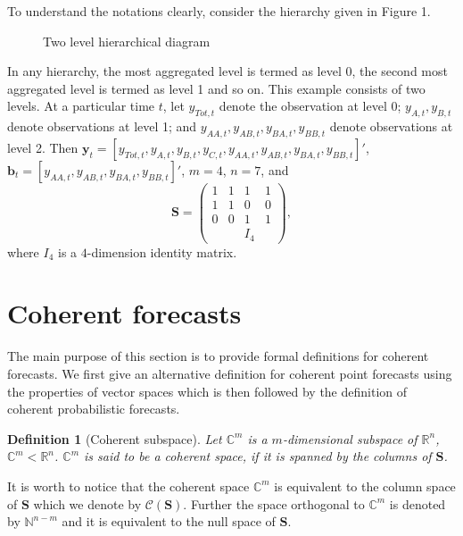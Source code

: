 \documentclass[a4paper, 11pt]{article}
\newtheorem{definition}{Definition}[section]
\begin{document}
\noindent 
To understand the notations clearly, consider the hierarchy given in Figure 1.
\begin{figure}[H]
	\begin{center}
		  
		 
		\qobitree
	\end{center}
	\caption{Two level hierarchical diagram}
\end{figure}
\noindent
In any hierarchy, the most aggregated level is termed as level 0, the second most aggregated level is termed as level 1 and so on. This example consists of two levels. At a particular time $t$, let $y_{Tot,t}$ denote the observation at level 0; $y_{A,t}, y_{B,t} $ denote observations at level 1; and $y_{AA,t}, y_{AB,t}, y_{BA,t}, y_{BB,t}$ denote observations at level 2. Then $\bm{y}_t = [y_{Tot,t},y_{A,t}, y_{B,t},y_{C,t},y_{AA,t}, y_{AB,t}, y_{BA,t}, y_{BB,t}]'$, \\$\bm{b}_t = [y_{AA,t}, y_{AB,t}, y_{BA,t}, y_{BB,t}]'$, $m=4$, $n=7$, and $$ \bm{S} = \begin{pmatrix} 1& 1 &1 &1  \\ 1 &1 & 0 &0 \\   0&0  & 1 & 1 \\ & & I_4 &   \end{pmatrix}, $$ where $I_4$ is a $4$-dimension identity matrix.  

\section{Coherent forecasts}\label{sec:definitions}

The main purpose of this section is to provide formal definitions for coherent forecasts. We first give an alternative definition for coherent point forecasts using the properties of vector spaces which is then followed by the definition of coherent probabilistic forecasts. 

\begin{definition}[Coherent subspace]
	Let $\bm{\mathbb{C}}^m$ is a $m$-dimensional subspace of $\bm{\mathbb{R}}^n$, $\bm{\mathbb{C}}^m < \bm{\mathbb{R}}^n$. $\bm{\mathbb{C}}^m$ is said to be a coherent space, if it is spanned by the columns of $\bm{S}$. 
\end{definition}

It is worth to notice that the coherent space $\bm{\mathbb{C}}^m$ is equivalent to the column space of $\bm{S}$ which we denote by $\mathscr{C}(\bm{S})$. Further the space orthogonal to $\bm{\mathbb{C}}^m$ is denoted by $\bm{\mathbb{N}}^{n-m}$ and it is equivalent to the null space of $\bm{S}$.
\end{document}
